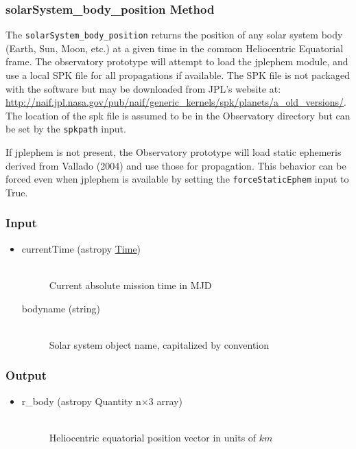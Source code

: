 \documentclass[cleanfoot]{asme2ej}
\begin{document}
\subsubsection{solarSystem\_body\_position Method} \label{sec:ssbPosTask}
The \verb+solarSystem_body_position+ returns the position of any solar system body (Earth, Sun, Moon, etc.) at a given time in the common Heliocentric Equatorial frame.  The observatory prototype will attempt to load the jplephem module, and use a local SPK file for all propagations if available.  The SPK file is not packaged with the software but may be downloaded from JPL's website at: \url{http://naif.jpl.nasa.gov/pub/naif/generic_kernels/spk/planets/a_old_versions/}.  The location of the spk file is assumed to be in the Observatory directory but can be set by the \verb+spkpath+ input.  

If jplephem is not present, the Observatory prototype will load static ephemeris derived from Vallado (2004) and use those for propagation.  This behavior can be forced even when jplephem is available by setting the \verb+forceStaticEphem+ input to True.
\subsubsection*{Input}
\begin{itemize}
\item
\begin{description}
    \item[currentTime (astropy \href{http://astropy.readthedocs.org/en/latest/time/index.html}{Time})] \hfill \\ Current absolute mission time in MJD
    \item[bodyname (string)] \hfill \\ Solar system object name, capitalized by convention
\end{description}
\end{itemize}
\subsubsection*{Output}
\begin{itemize}
\item
\begin{description}
    \item[r\_body (astropy Quantity n$\times$3 array)] \hfill \\ Heliocentric equatorial position vector in units of $ km $
\end{description}
\end{itemize}
\end{document}
